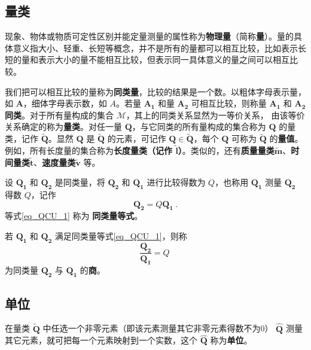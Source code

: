 \subsection{量类}
现象、物体或物质可定性区别并能定量测量的属性称为\textbf{物理量}（简称\textbf{量}）。量的具体意义指大小、轻重、长短等概念，并不是所有的量都可以相互比较，比如表示长短的量和表示大小的量不能相互比较，但表示同一具体意义的量之间可以相互比较。

我们把可以相互比较的量称为\textbf{同类量}，比较的结果是一个数。以粗体字母表示量，如 $\boldsymbol{A}$，细体字母表示数，如 $A$。若量 $\boldsymbol{A_1}$ 和量 $\boldsymbol{A_2}$ 可相互比较，则称量 $\boldsymbol{A_1}$ 和 $\boldsymbol{A_2}$ \textbf{同类}。对于所有量构成的集合 $\mathcal{M}$，其上的同类关系显然为一等价关系， 由该等价关系确定的称为\textbf{量类}。对任一量 $\boldsymbol{Q}$，与它同类的所有量构成的集合称为 $\boldsymbol{Q}$ 的量类，记作 $\tilde{\boldsymbol{Q}}$。显然 $\boldsymbol{Q}$ 是 $\tilde{\boldsymbol{Q}}$ 的元素，可记作 $\boldsymbol{Q}\in \tilde{\boldsymbol{Q}}$，每个 $\boldsymbol{Q}$ 可称为 $\tilde{\boldsymbol{Q}}$ 的\textbf{量值}。例如，所有长度量的集合称为\textbf{长度量类（记作 $\tilde{\boldsymbol{l}}$）}。类似的，还有\textbf{质量量类}$\tilde{\boldsymbol{m}}$、\textbf{时间量类}$\tilde{\boldsymbol{t}}$、\textbf{速度量类}$\tilde{\boldsymbol{v}}$ 等。

设 $\boldsymbol{Q_1}$ 和 $\boldsymbol{Q_2}$ 是同类量，将 $\boldsymbol{Q_2}$ 和 $\boldsymbol{Q_1}$ 进行比较得数为 $Q$，也称用 $\boldsymbol{Q_1}$ 测量 $\boldsymbol{Q_2}$ 得数 $Q$，记作
\begin{equation}\label{eq_QCU_1}
\boldsymbol{Q_2}=Q\boldsymbol{Q_1}~.
\end{equation}
等式\autoref{eq_QCU_1} 称为 \textbf{同类量等式}。
\begin{definition}{}
若 $\boldsymbol{Q_1}$ 和 $\boldsymbol{Q_2}$ 满足同类量等式\autoref{eq_QCU_1}，则称
\begin{equation}\label{eq_QCU_4}
\frac{\boldsymbol{Q_2}}{\boldsymbol{Q_1}}=Q~
\end{equation}
为同类量 $\boldsymbol{Q_2}$ 与 $\boldsymbol{Q_1}$ 的\textbf{商}。
\end{definition}
\subsection{单位}
在量类 $\tilde{\boldsymbol{Q}}$ 中任选一个非零元素（即该元素测量其它非零元素得数不为0） $\hat{\boldsymbol{Q}}$ 测量其它元素，就可把每一个元素映射到一个实数，这个 $\hat{\boldsymbol{Q}}$ 称为\textbf{单位}。

